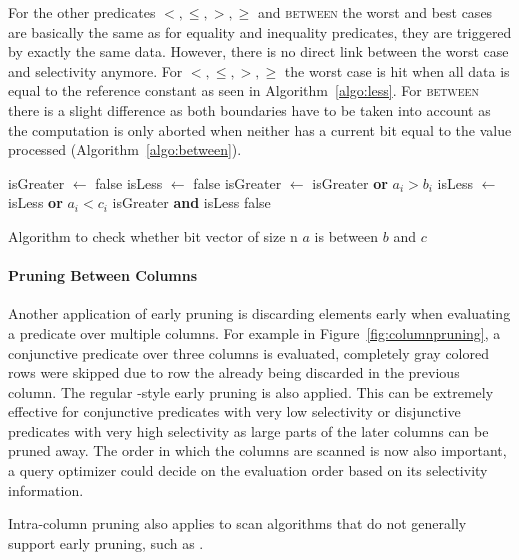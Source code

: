 For the other predicates $<,\le,>,\ge$ and \textsc{between} the worst and best
cases are basically the same as for equality and inequality predicates, they are
triggered by exactly the same data.  However, there is no direct link between
the worst case and selectivity anymore. For $<,\le,>,\ge$ the worst case is hit
when all data is equal to the reference constant as seen in
Algorithm~\ref{algo:less}. For \textsc{between} there is a slight difference as
both boundaries have to be taken into account as the computation is only aborted
when neither has a current bit equal to the value processed
(Algorithm~\ref{algo:between}).

\begin{algorithm}[h]
\begin{algorithmic}[1]
    \State isGreater $\gets$ false
    \State isLess $\gets$ false
      \State isGreater $\gets$ isGreater \textbf{or} $a_i > b_i$
      \State isLess $\gets$ isLess \textbf{or} $a_i < c_i$
        \State \Return isGreater \textbf{and} isLess
      \EndIf
    \EndFor
    \State \Return false
  \EndProcedure
\end{algorithmic}
\caption{Algorithm to check whether bit vector of size n $a$ is between $b$ and $c$}
\label{algo:between}
\end{algorithm}

\paragraph{Pruning Between Columns}

Another application of early pruning is discarding elements early when
evaluating a predicate over multiple columns. For example in
Figure~\ref{fig:columnpruning}, a conjunctive predicate over three columns is
evaluated, completely gray colored rows were skipped due to row the already being
discarded in the previous column. The regular \bwv{}-style early pruning is
also applied. This can be extremely effective for conjunctive predicates with
very low selectivity or disjunctive predicates with very high selectivity as
large parts of the later columns can be pruned away.  The order in which the
columns are scanned is now also important, a query optimizer could decide on the
evaluation order based on its selectivity information.

Intra-column pruning also applies to scan algorithms that do not generally
support early pruning, such as \simdscan{}.

